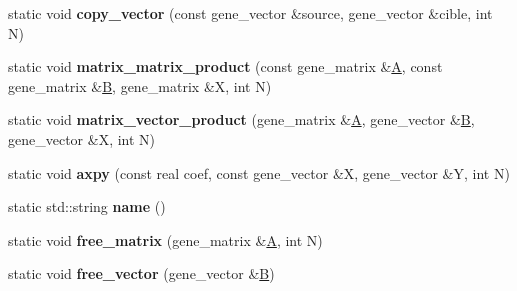 \begin{DoxyCompactItemize}
\item 
\mbox{\label{classtiny__blitz__interface_a7bad519f87a2e816fc1057be59fa8274}} 
static void {\bfseries copy\+\_\+vector} (const gene\+\_\+vector \&source, gene\+\_\+vector \&cible, int N)
\item 
\mbox{\label{classtiny__blitz__interface_a3e82c9c3e4313dca04a39a1e008c3338}} 
static void {\bfseries matrix\+\_\+matrix\+\_\+product} (const gene\+\_\+matrix \&\hyperlink{group___core___module_class_eigen_1_1_matrix}{A}, const gene\+\_\+matrix \&\hyperlink{group___core___module_class_eigen_1_1_matrix}{B}, gene\+\_\+matrix \&X, int N)
\item 
\mbox{\label{classtiny__blitz__interface_a3ea2c99ad23bd6b1fdcac48daca36a0a}} 
static void {\bfseries matrix\+\_\+vector\+\_\+product} (gene\+\_\+matrix \&\hyperlink{group___core___module_class_eigen_1_1_matrix}{A}, gene\+\_\+vector \&\hyperlink{group___core___module_class_eigen_1_1_matrix}{B}, gene\+\_\+vector \&X, int N)
\item 
\mbox{\label{classtiny__blitz__interface_ac1c10a663efa08c588815583929872d6}} 
static void {\bfseries axpy} (const real coef, const gene\+\_\+vector \&X, gene\+\_\+vector \&Y, int N)
\item 
\mbox{\label{classtiny__blitz__interface_a86440368a1d7bed97f319f1ccfff907a}} 
static std\+::string {\bfseries name} ()
\item 
\mbox{\label{classtiny__blitz__interface_a724baba4591ea90a26cec9538f542899}} 
static void {\bfseries free\+\_\+matrix} (gene\+\_\+matrix \&\hyperlink{group___core___module_class_eigen_1_1_matrix}{A}, int N)
\item 
\mbox{\label{classtiny__blitz__interface_a68372e7d8403541a21569159c0206ed0}} 
static void {\bfseries free\+\_\+vector} (gene\+\_\+vector \&\hyperlink{group___core___module_class_eigen_1_1_matrix}{B})
\item 
\mbox{\label{classtiny__blitz__interface_a30084b8eff48e072daac15fa1040e1f4}} 

\end{DoxyCompactItemize}
